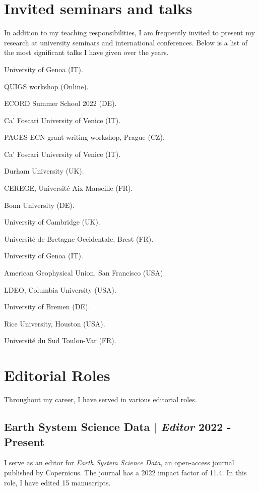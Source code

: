 \documentclass[11pt]{article}
\begin{document}
\section{Invited seminars and talks}
{\normalfont In addition to my teaching responsibilities, I am frequently invited to present my research at university seminars and international conferences. Below is a list of the most significant talks I have given over the years.}\\
{\footnotesize 
\begin{description}
  \item [2023] University of Genoa (IT).
  \item [2023] QUIGS workshop (Online).
  \item [2022] ECORD Summer School 2022 (DE).
  \item [2021] Ca’ Foscari University of Venice (IT).
  \item [2019] PAGES ECN grant-writing workshop, Prague (CZ).
  \item [2018] Ca’ Foscari University of Venice (IT).
  \item [2018] Durham University (UK).
  \item [2018] CEREGE, Université Aix-Marseille (FR).
  \item [2017] Bonn University (DE).
  \item [2017] University of Cambridge (UK).
  \item [2017] Université de Bretagne Occidentale, Brest (FR).
  \item [2017] University of Genoa (IT).
  \item [2016] American Geophysical Union, San Francisco (USA).
  \item [2015] LDEO, Columbia University (USA).
  \item [2013] University of Bremen (DE).
  \item [2012] Rice University, Houston (USA).
  \item [2008] Université du Sud Toulon-Var (FR).
  \item \end{description}}
\newpage
\section{Editorial Roles}
{\normalfont Throughout my career, I have served in various editorial roles.}\\

\bigskip

\subsection{Earth System Science Data $|$ {\normalfont\textit{Editor}} \hfill 2022 - Present}
{\footnotesize I serve as an editor for \textit{Earth System Science Data}, an open-access journal published by Copernicus. The journal has a 2022 impact factor of 11.4. In this role, I have edited 15 manuscripts.}
\bigskip
\end{document}
